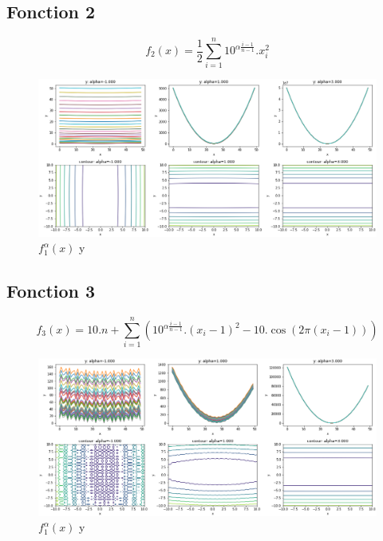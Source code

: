 \documentclass[twoside,10pt,a4paper]{article}
\numberwithin{equation}{section}					%
\numberwithin{figure}{section}						%
\begin{document}
\subsection{Fonction 2}\label{sec:subsection1}
\begin{equation}
    f_2(x) = \frac{1}{2} \sum_{i=1}^{n} 10^{\alpha \frac {i-1} {n-1}}.x_i^2
    \label{eq:simple}		%
\end{equation}
\begin{figure}[H]
    \centering
    \includegraphics[width=\textwidth]{imgs/contours/f_2_texpres}
    \caption{$f_1^{\alpha}(x)$ y }
    \label{fig:mesh1}
\end{figure}
\subsection{Fonction 3}\label{sec:subsection1}
\begin{equation}
f_3(x) = 10.n + \sum_{i=1}^{n} (10^{\alpha \frac {i-1} {n-1}}.(x_i - 1)^2 - 10.\cos(2\pi(x_i - 1)))
\label{eq:simple}		%
\end{equation}
\begin{figure}[H]
    \centering
    \includegraphics[width=\textwidth]{imgs/contours/f_3_texpres}
    \caption{$f_1^{\alpha}(x)$ y }
    \label{fig:mesh1}
\end{figure}
\end{document}

